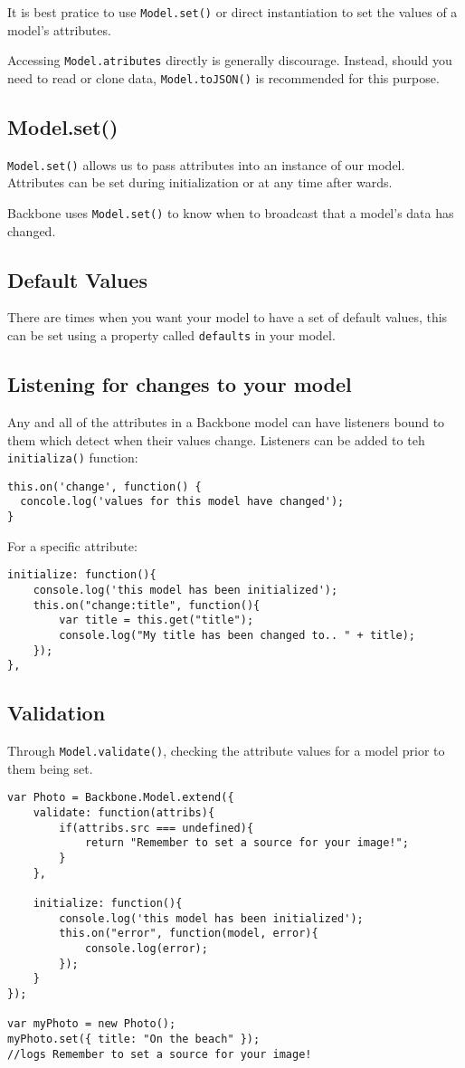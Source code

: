 \documentclass[a4paper, 11pt]{book}
\begin{document}
It is best pratice to use \verb|Model.set()| or direct instantiation to set the
values of a model's attributes.

Accessing \verb|Model.atributes| directly is generally discourage. Instead,
should you need to read or clone data, \verb|Model.toJSON()| is recommended for
this purpose.

\subsection{Model.set()}
\verb|Model.set()| allows us to pass attributes into an instance of our model.
Attributes can be set during initialization or at any time after wards. 

Backbone uses \verb|Model.set()| to know when to broadcast that a model's data
has changed.
\subsection{Default Values}
There are times when you want your model to have a set of default values, this
can be set using a property called \verb|defaults| in your model.
\subsection{Listening for changes to your model}
Any and all of the attributes in a Backbone model can have listeners bound to
them which detect when their values change. Listeners can be added to teh
\verb|initializa()| function:
\begin{verbatim}
this.on('change', function() {
  concole.log('values for this model have changed');
}
\end{verbatim}
For a specific attribute:
\begin{verbatim}
initialize: function(){
    console.log('this model has been initialized');
    this.on("change:title", function(){
        var title = this.get("title");
        console.log("My title has been changed to.. " + title);
    });
},
\end{verbatim}
\subsection{Validation}
Through \verb|Model.validate()|, checking the attribute values for a model prior to them being set.
\begin{verbatim}
var Photo = Backbone.Model.extend({
    validate: function(attribs){
        if(attribs.src === undefined){
            return "Remember to set a source for your image!";
        }
    },

    initialize: function(){
        console.log('this model has been initialized');
        this.on("error", function(model, error){
            console.log(error);
        });
    }
});

var myPhoto = new Photo();
myPhoto.set({ title: "On the beach" });
//logs Remember to set a source for your image!
\end{verbatim}
\end{document}
